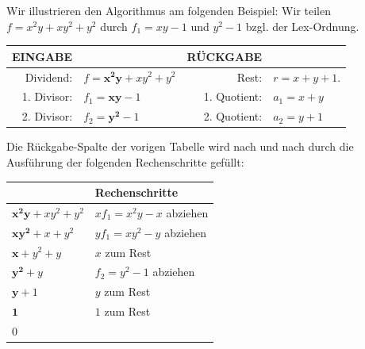 \documentclass[11pt]{article}
\numberwithin{equation}{section}
\begin{document}
\begin{beispiel} 
Wir illustrieren den Algorithmus am folgenden Beispiel: 
Wir teilen $f= x^2 y + x y^2 + y^2$ durch $f_1 = xy -1$ und $y^2 -1$ bzgl. der Lex-Ordnung. 

\begin{center}
\begin{tabular}{rl|rl} 	
		EINGABE&  &  RÜCKGABE & 
	\\ \hline Dividend: & $f=\mathbf{x^2 y} + x y^2  + y^2$ &  Rest: & $ r=x+ y + 1$. 
	\\ 1. Divisor: & $f_1=\mathbf{xy} - 1$ & 1. Quotient: & $a_1=x+y$ 
	\\ 2. Divisor: & $f_2=\mathbf{y^2} - 1$ & 2. Quotient: & $a_2=y + 1 $
\end{tabular}
\end{center}  

Die Rückgabe-Spalte der vorigen Tabelle wird nach und nach durch die Ausführung der folgenden Rechenschritte gefüllt: 

\begin{center} 
\renewcommand{\arraystretch}{1.5} 
\begin{tabular}{l|l} 
 & Rechenschritte
\\ \hline $\mathbf{x^2 y} + x y^2 + y^2$ & $ x f_1 = x^2 y - x$ abziehen  
\\ 
$\mathbf{x y^2} + x + y^2$ & $y f_1 = x y^2 - y$ abziehen  
 \\ 
 $\mathbf{x} + y^2 + y$ & $x$ zum Rest
 \\   $\mathbf{y^2}  + y$ & $f_2 = y^2 - 1$ abziehen 
 \\ 
 $\mathbf{y} + 1$ & $y$ zum Rest
 \\ 
$\mathbf{1}$ & $1$ zum Rest
\\  $0$ 
\end{tabular} 
\end{center} 
\end{beispiel}
\end{document}
